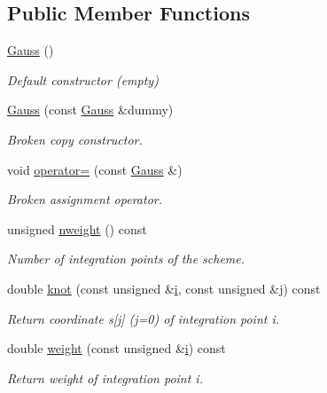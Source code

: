 \subsection*{Public Member Functions}
\begin{DoxyCompactItemize}
\item 
\hyperlink{classoomph_1_1Gauss_3_011_00_013_01_4_aab9cc062b967a5ecdd8672b0b1a76786}{Gauss} ()
\begin{DoxyCompactList}\small\item\em Default constructor (empty) \end{DoxyCompactList}\item 
\hyperlink{classoomph_1_1Gauss_3_011_00_013_01_4_acd86ad7f9056e9dd6dad427918d874da}{Gauss} (const \hyperlink{classoomph_1_1Gauss}{Gauss} \&dummy)
\begin{DoxyCompactList}\small\item\em Broken copy constructor. \end{DoxyCompactList}\item 
void \hyperlink{classoomph_1_1Gauss_3_011_00_013_01_4_a9c73073da51aabd3b9fa7ad395cc3462}{operator=} (const \hyperlink{classoomph_1_1Gauss}{Gauss} \&)
\begin{DoxyCompactList}\small\item\em Broken assignment operator. \end{DoxyCompactList}\item 
unsigned \hyperlink{classoomph_1_1Gauss_3_011_00_013_01_4_a8521ff77bcac8afc612779aed48f3bd4}{nweight} () const
\begin{DoxyCompactList}\small\item\em Number of integration points of the scheme. \end{DoxyCompactList}\item 
double \hyperlink{classoomph_1_1Gauss_3_011_00_013_01_4_a51a037fb3812b418ff85d382ef1db1fa}{knot} (const unsigned \&\hyperlink{cfortran_8h_adb50e893b86b3e55e751a42eab3cba82}{i}, const unsigned \&j) const
\begin{DoxyCompactList}\small\item\em Return coordinate s\mbox{[}j\mbox{]} (j=0) of integration point i. \end{DoxyCompactList}\item 
double \hyperlink{classoomph_1_1Gauss_3_011_00_013_01_4_a3487f0b3416c7f8b6e81b4c86af53c05}{weight} (const unsigned \&\hyperlink{cfortran_8h_adb50e893b86b3e55e751a42eab3cba82}{i}) const
\begin{DoxyCompactList}\small\item\em Return weight of integration point i. \end{DoxyCompactList}\end{DoxyCompactItemize}
